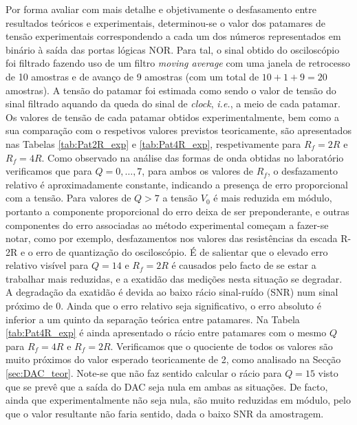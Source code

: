 \documentclass[a4paper, oneside]{article}
\begin{document}
Por forma avaliar com mais detalhe e objetivamente o desfasamento entre resultados teóricos e experimentais, determinou-se o valor dos patamares de tensão experimentais correspondendo a cada um dos números representados em binário à saída das portas lógicas NOR. Para tal, o sinal obtido do osciloscópio foi filtrado fazendo uso de um filtro \textit{moving average} com uma janela de retrocesso de 10 amostras e de avanço de 9 amostras (com um total de $10+1+9 = 20$ amostras). A tensão do patamar foi estimada como sendo o valor de tensão do sinal filtrado aquando da queda do sinal de \textit{clock}, \textit{i.e.}, a meio de cada patamar. Os valores de tensão de cada patamar obtidos experimentalmente, bem como a sua comparação com o respetivos valores previstos teoricamente, são apresentados nas Tabelas \ref{tab:Pat2R_exp} e \ref{tab:Pat4R_exp}, respetivamente para $R_f = 2R$ e $R_f = 4R$. Como observado na análise das formas de onda obtidas no laboratório verificamos que para $Q = 0,\ldots,7$, para ambos os valores de $R_f$, o desfazamento relativo é aproximadamente constante, indicando a presença de erro proporcional com a tensão. Para valores de $Q>7$ a tensão $V_0$ é mais reduzida em módulo, portanto a componente proporcional do erro deixa de ser preponderante, e outras componentes do erro associadas ao método experimental começam a fazer-se notar, como por exemplo, desfazamentos nos valores das resistências da escada R-2R e o erro de quantização do osciloscópio. É de salientar que o elevado erro relativo visível para $Q=14$ e $R_f = 2R$ é causados pelo facto de se estar a trabalhar mais reduzidas, e a exatidão das medições nesta situação se degradar. A degradação da exatidão é devida ao baixo rácio sinal-ruído (SNR) num sinal próximo de 0.  Ainda que o erro relativo seja significativo, o erro absoluto é inferior a um quinto da separação teórica entre patamares. Na Tabela \ref{tab:Pat4R_exp} é ainda apresentado o rácio entre patamares com o mesmo $Q$ para $R_f = 4R$ e $R_f = 2R$. Verificamos que o quociente de todos os valores são muito próximos do valor esperado teoricamente de 2, como analisado na Secção \ref{sec:DAC_teor}. Note-se que não faz sentido calcular o rácio para $Q=15$ visto que se prevê que a saída do DAC seja nula em ambas as situações. De facto, ainda que experimentalmente não seja nula, são muito reduzidas em módulo, pelo que o valor resultante não faria sentido, dada o baixo SNR da amostragem.
\end{document}
